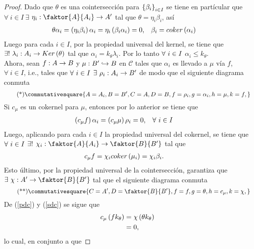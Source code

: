 \documentclass{article}
\begin{document}
\begin{enumerate}[label=\textbf{Ej \arabic*.}]
\begin{proof}
			 Dado que $\theta$ es una cointersección para $\left\{\beta_i\right\}_{i\in I}$ se tiene en partícular que $\forall\ i\in I\ \exists$ $\catarrow{\eta_i}{\faktor{A}{A_i}}{A'}{}$ tal que $\theta=\eta_i\beta_i$, así
			\begin{align*}
				\theta\alpha_i&=\left(\eta_i\beta_i\right)\alpha_i=\eta_i\left(\beta_i\alpha_i\right)=0, && \beta_i=coker\left(\alpha_i\right)
			\end{align*}
			Luego para cada $i\in I$, por la propiedad universal del kernel, se tiene que $\exists !\ \catarrow{\lambda_i}{A_i}{Ker\lrprth{\theta}}{}$ tal que $\alpha_i=k_{\theta}\lambda_i$. Por lo tanto $\forall\ \copyandpaste$ $\alpha_i\leq k_{\theta}$.\\
			
			Ahora, sean $\catarrow{f}{A}{B}{}$ y $\catarrow{\mu}{B'}{B}{m}$ en $\mathscr{C}$ tales que $\alpha_i$ es llevado a $\mu$ vía $f$, $\forall\ i\in I$, i.e., tales que $\forall\ \copyandpaste$ $\exists\ \catarrow{\rho_i}{A_i}{B'}{}$ de modo que el siguiente diagrama conmuta
			\begin{equation*}\tag{*}\label{pdc}
				\commutativesquare{A=A_i,B=B',C=A,D=B, f=\rho_i,g=\alpha_i,h=\mu,k=f,}
			\end{equation*}
			Si $c_{\mu}$ es un cokernel para $\mu$, entonces por lo anterior se tiene que
			\begin{align*}
				\left(c_{\mu}f\right)\alpha_i&=\left(c_{\mu}\mu\right)\rho_i=0, && \forall\ i\in I
			\end{align*}
			Luego, aplicando para cada $i\in I$ la propiedad universal del cokernel, se tiene que $\forall\ \copyandpaste$ $\exists !$ $\catarrow{\chi_i}{\faktor{A}{A_i}}{\faktor{B}{B'}}{}$ tal que 
			\begin{align*}
				c_{\mu}f&=\chi_icoker\left(\mu_i\right)=\chi_i\beta_i.
			\end{align*}
			Esto último, por la propiedad universal de la cointersección, garantiza que $\exists\ \catarrow{\chi}{A'}{\faktor{B}{B'}}{}$ tal que el siguiente diagrama conmuta
			\begin{equation*}\tag{**}\label{sdc}
				\commutativesquare{C=A',D=\faktor{B}{B'},f=f,g=\theta,h=c_{\mu},k=\chi,}
			\end{equation*}
			De (\ref{pdc}) y (\ref{sdc}) se sigue que
			\begin{align*}
				c_{\mu}\left(fk_{\theta}\right)&=\chi\left(\theta k_{\theta}\right)\\
				&=0,
			\end{align*}
			lo cual, en conjunto a que 

\end{proof}
\end{enumerate}
\end{document}
